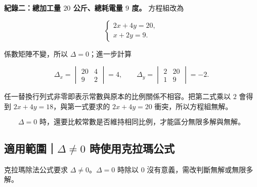 \documentclass[11pt,a4paper]{article}
\begin{document}
\begin{HandoutWorkedExample}
\textbf{紀錄二：總加工量 \(20\) 公斤、總耗電量 \(9\) 度。} 方程組改為

\[
\begin{cases}
2x+4y=20,\\
x+2y=9.
\end{cases}
\]

係數矩陣不變，所以 \(\Delta=0\)；進一步計算

\[
\Delta_x=
\begin{vmatrix}
20&4\\
9&2
\end{vmatrix}=4,
\qquad
\Delta_y=
\begin{vmatrix}
2&20\\
1&9
\end{vmatrix}=-2.
\]

任一替換行列式非零即表示常數與原本的比例關係不相容。把第二式乘以 \(2\) 會得到 \(2x+4y=18\)，與第一式要求的 \(2x+4y=20\) 衝突，所以方程組無解。

\[
\boxed{\Delta=0\text{ 時，還要比較常數是否維持相同比例，才能區分無限多解與無解。}}
\]

\end{HandoutWorkedExample}

\subsection{\texorpdfstring{適用範圍｜\(\Delta\ne0\) 時使用克拉瑪公式}{適用範圍｜\textbackslash Delta\textbackslash ne0 時使用克拉瑪公式}}\label{ux9069ux7528ux7bc4ux570ddeltane0-ux6642ux4f7fux7528ux514bux62c9ux746aux516cux5f0f}

克拉瑪除法公式要求 \(\Delta\ne0\)。\(\Delta=0\) 時除以 \(0\) 沒有意義，需改判斷無解或無限多解。
\end{document}
